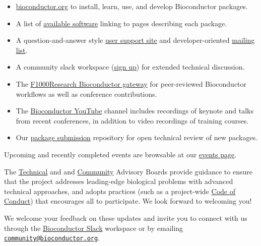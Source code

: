 \begin{itemize}
\tightlist
\item
  \href{https://bioconductor.org}{bioconductor.org} to install,
  learn, use, and develop Bioconductor packages.
\item
  A list of \href{https://bioconductor.org/packages}{available software}
  linking to pages describing each package.
\item
  A question-and-answer style
  \href{https://support.bioconductor.org}{user support site} and
  developer-oriented \href{https://stat.ethz.ch/mailman/listinfo/bioc-devel}{mailing list}.
\item
  A community slack workspace (\href{https://slack.bioconductor.org}{sign up})
  for extended technical discussion.
\item
  The \href{https://f1000research.com/gateways/bioconductor}{F1000Research Bioconductor gateway}
  for peer-reviewed Bioconductor workflows as well as conference contributions.
\item
  The \href{https://www.youtube.com/user/bioconductor}{Bioconductor YouTube}
  channel includes recordings of keynote and talks from recent
  conferences, in addition to
  video recordings of training courses.
\item
  Our \href{https://github.com/Bioconductor/Contributions}{package submission}
  repository for open technical review of new packages.
\end{itemize}

Upcoming and recently completed events are browsable at our
\href{https://bioconductor.org/help/events/}{events page}.

The \href{https://bioconductor.org/about/technical-advisory-board/}{Technical}
and and \href{https://bioconductor.org/about/community-advisory-board/}{Community}
Advisory Boards provide guidance to ensure that the project addresses
leading-edge biological problems with advanced technical approaches,
and adopts practices (such as a
project-wide \href{https://bioconductor.org/about/code-of-conduct/}{Code of Conduct})
that encourages all to participate. We look forward to
welcoming you!

We welcome your feedback on these updates and invite you to connect with us through the \href{https://slack.bioconductor.org}{Bioconductor Slack} workspace or by emailing \href{mailto:community@bioconductor.org}{\nolinkurl{community@bioconductor.org}}.


\address{%
Maria Doyle, Bioconductor Community Manager\\
University of Limerick\\%
\\
%
%
%
%
}

\address{%
Bioconductor Core Developer Team\\
Dana-Farber Cancer Institute, Roswell Park Comprehensive Cancer Center, City University of New York, Fred Hutchinson Cancer Research Center, Mass General Brigham\\%
\\
%
%
%
%
}
